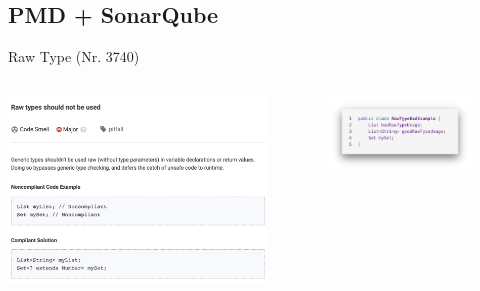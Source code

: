 \documentclass{sdqbeamer}
\begin{document}
\subsection{PMD + SonarQube}

\begin{frame}{Raw Type (Nr. 3740)}
    \begin{columns}
        \begin{column}{0.58\textwidth}
            \includegraphics[scale=0.27]{logos/RawTypeSonarQube.png}
        \end{column}
        \begin{column}{0.38\textwidth}
            \begin{figure}
                \hspace{-1.25cm}
                \includegraphics[scale=0.25]{logos/RawTypeBadExample.png}
            \end{figure}
        \end{column}
    \end{columns}
\end{frame}
\end{document}
